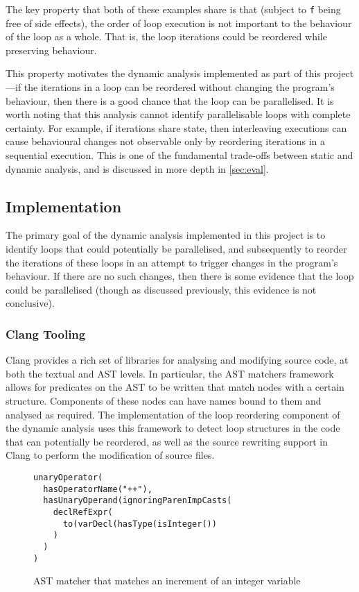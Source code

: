 \documentclass[journal]{IEEEtran}
\begin{document}
The key property that both of these examples share is that (subject to
\texttt{f} being free of side effects), the order of loop execution is not
important to the behaviour of the loop as a whole. That is, the loop iterations
could be reordered while preserving behaviour.

This property motivates the dynamic analysis implemented as part of this
project---if the iterations in a loop can be reordered without changing the
program's behaviour, then there is a good chance that the loop can be
parallelised. It is worth noting that this analysis cannot identify
parallelisable loops with complete certainty. For example, if iterations share
state, then interleaving executions can cause behavioural changes not observable
only by reordering iterations in a sequential execution. This is one of the
fundamental trade-offs between static and dynamic analysis, and is discussed in
more depth in \autoref{sec:eval}.

\subsection{Implementation} \label{ssec:impl}

The primary goal of the dynamic analysis implemented in this project is to
identify loops that could potentially be parallelised, and subsequently to
reorder the iterations of these loops in an attempt to trigger changes in the
program's behaviour. If there are no such changes, then there is some evidence
that the loop could be parallelised (though as discussed previously, this
evidence is not conclusive).

\subsubsection{Clang Tooling}

Clang provides a rich set of libraries for analysing and modifying source code,
at both the textual and AST levels. In particular, the AST matchers framework
allows for predicates on the AST to be written that match nodes with a certain
structure. Components of these nodes can have names bound to them and analysed
as required. The implementation of the loop reordering component of the dynamic
analysis uses this framework to detect loop structures in the code that can
potentially be reordered, as well as the source rewriting support in Clang to
perform the modification of source files. 

\begin{figure}[h]
  \centering
  \begin{lstlisting}
unaryOperator(
  hasOperatorName("++"),
  hasUnaryOperand(ignoringParenImpCasts(
    declRefExpr(
      to(varDecl(hasType(isInteger())
    )
  )
)
  \end{lstlisting}
  \caption{AST matcher that matches an increment of an integer variable}
  \label{lst:astm}
\end{figure}
\end{document}
